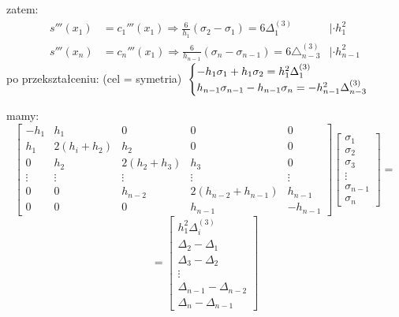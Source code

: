     \begin{frame}
    	zatem:
        \begin{align*}
        	s'''(x_{1})&=c_{1}'''(x_{1}) \Rightarrow
            \frac{6}{h_{1}}(\sigma_{2}-\sigma_{1})=6\Delta_{1}^{(3)}
            &|\cdot h_{1}^{2}
            \\
            s'''(x_{n})&=c_{n}'''(x_{1}) \Rightarrow
            \frac{6}{h_{n-1}}(\sigma_{n}-\sigma_{n-1})=6\triangle_{n-3}^{(3)}
            &|\cdot h_{n-1}^{2}
        \end{align*}
        po przekształceniu: (cel = symetria)
        $\newline \newline
        \begin{cases}
        	-h_{1}\sigma_{1}+h_{1}\sigma_{2}=h_{1}^{2}\Delta_{1}^{(3)}
            \\
		h_{n-1}\sigma_{n-1}-h_{n-1}\sigma_{n}=-h_{n-1}^{2}\Delta_{n-3}^{(3)}
        \end{cases}
        $
    \end{frame}
    \begin{frame}
    	mamy:
        \[
        \begin{bmatrix}
    -h_{1} & h_{1} & 0 & 0  & 0 \\
    h_{1} & 2(h_{i}+h_{2}) & h_{2} & 0  & 0 \\
    0 & h_{2} & 2(h_{2}+h_{3}) & h_{3} & 0 \\
    \vdots & \vdots & \vdots & \vdots & \vdots \\
    0 & 0 & h_{n-2} & 2(h_{n-2}+h_{n-1}) & h_{n-1} \\
    0 & 0 & 0 & h_{n-1}  & -h_{n-1}
		\end{bmatrix}
        \begin{bmatrix}
        	\sigma_{1} \\
            \sigma_{2} \\
            \sigma_{3} \\
            \vdots \\
            \sigma_{n-1} \\
            \sigma_{n}
        \end{bmatrix}
       	=
        \]
        \[	=
        	\begin{bmatrix}
        		h_{1}^{2}\Delta^{(3)}_{i} \\
                \Delta_{2} - \Delta_{1} \\
                \Delta_{3} - \Delta_{2} \\
                \vdots \\ 
                \Delta_{n-1} - \Delta_{n-2} \\
                \Delta_{n} - \Delta_{n-1}
        	\end{bmatrix}
        \]
    \end{frame}
